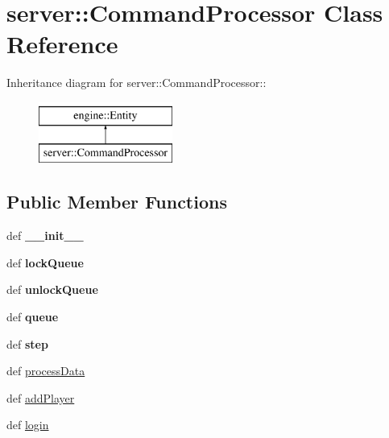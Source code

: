 \hypertarget{classserver_1_1CommandProcessor}{
\section{server::CommandProcessor Class Reference}
\label{classserver_1_1CommandProcessor}
}
Inheritance diagram for server::CommandProcessor::\begin{figure}[H]
\begin{center}
\leavevmode
\includegraphics[height=2cm]{classserver_1_1CommandProcessor}
\end{center}
\end{figure}
\subsection*{Public Member Functions}
\begin{DoxyCompactItemize}
\item 
\hypertarget{classserver_1_1CommandProcessor_a94af5de40814b0bbfcc427397a0593f1}{
def {\bfseries \_\-\_\-init\_\-\_\-}}
\label{classserver_1_1CommandProcessor_a94af5de40814b0bbfcc427397a0593f1}

\item 
\hypertarget{classserver_1_1CommandProcessor_a97aba9b5f69e54284a59779d6a861a77}{
def {\bfseries lockQueue}}
\label{classserver_1_1CommandProcessor_a97aba9b5f69e54284a59779d6a861a77}

\item 
\hypertarget{classserver_1_1CommandProcessor_a59451fbff3f92f014a02c20001b8d19e}{
def {\bfseries unlockQueue}}
\label{classserver_1_1CommandProcessor_a59451fbff3f92f014a02c20001b8d19e}

\item 
\hypertarget{classserver_1_1CommandProcessor_ab0b37f081870accecb3311fb756fafca}{
def {\bfseries queue}}
\label{classserver_1_1CommandProcessor_ab0b37f081870accecb3311fb756fafca}

\item 
\hypertarget{classserver_1_1CommandProcessor_adfbc8e43f3143865981b489075a00adc}{
def {\bfseries step}}
\label{classserver_1_1CommandProcessor_adfbc8e43f3143865981b489075a00adc}

\item 
def \hyperlink{classserver_1_1CommandProcessor_acc6fe3dd91d4fdf1f62a77533c9c788a}{processData}
\item 
def \hyperlink{classserver_1_1CommandProcessor_a9e1c9fcb08ab4ee46e832153cbb65b60}{addPlayer}
\item 
def \hyperlink{classserver_1_1CommandProcessor_ab08f48cd02cb0b2ec77673fe3c590f27}{login}
\end{DoxyCompactItemize}
